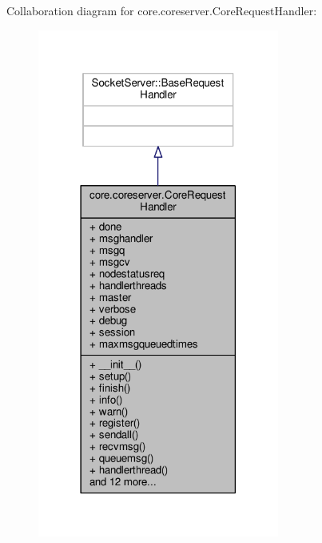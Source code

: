 Collaboration diagram for core.\+coreserver.\+Core\+Request\+Handler\+:
\nopagebreak
\begin{figure}[H]
\begin{center}
\leavevmode
\includegraphics[width=225pt]{classcore_1_1coreserver_1_1_core_request_handler__coll__graph}
\end{center}
\end{figure}
